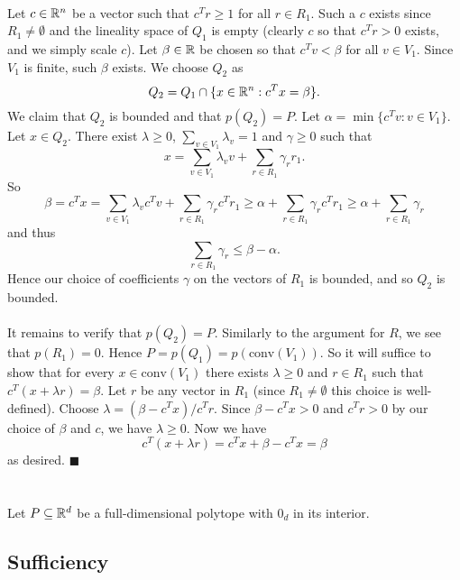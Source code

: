 \documentclass[letterpaper,12pt,oneside,onecolumn]{article}
\newcommand{\conv}[1]{\ensuremath{\text{conv}(#1) }}
\begin{document}
\paragraph{}
Let $c \in \mathbb{R}^n$ be a vector such that $c^Tr \geq 1$ for all $r \in R_1$. Such a $c$ exists since $R_1 \neq \emptyset$ and the lineality space of $Q_1$ is empty (clearly $c$ so that $c^Tr >0$ exists, and we simply scale $c$). Let $\beta \in \mathbb{R}$ be chosen so that $c^Tv < \beta$ for all $v \in V_1$. Since $V_1$ is finite, such $\beta$ exists. We choose $Q_2$ as
$$Q_2 = Q_1 \cap \{x \in \mathbb{R}^n : c^Tx = \beta\}.$$
We claim that $Q_2$ is bounded and that $p(Q_2) = P$. Let $\alpha = \min\{c^Tv : v \in V_1\}$. Let $x \in Q_2$. There exist $\lambda \geq 0$, $\sum_{v \in V_1} \lambda_v = 1$ and $\gamma \geq 0$ such that
$$x = \sum_{v \in V_1} \lambda_v v + \sum_{r \in R_1} \gamma_r r_1.$$
So
$$\beta = c^Tx =  \sum_{v \in V_1} \lambda_v c^Tv + \sum_{r \in R_1} \gamma_r c^Tr_1 \geq \alpha + \sum_{r \in R_1} \gamma_r c^Tr_1\geq \alpha + \sum_{r \in R_1} \gamma_r$$
and thus $$\sum_{r \in R_1} \gamma_r \leq \beta -\alpha.$$
Hence our choice of coefficients $\gamma$ on the vectors of $R_1$ is bounded, and so $Q_2$ is bounded.
\paragraph{}
It remains to verify that $p(Q_2) = P$. Similarly to the argument for $R$, we see that $p(R_1) = 0$. Hence $P = p(Q_1) = p(\conv{V_1}).$ So it will suffice to show that for every $x \in \conv{V_1}$ there exists $\lambda \geq 0$ and $r \in R_1$ such that $c^T(x + \lambda r) = \beta.$ Let $r$ be any vector in $R_1$ (since $R_1 \neq \emptyset$ this choice is well-defined). Choose $\lambda = (\beta - c^Tx)/c^Tr$. Since $\beta-c^Tx >0$ and $c^Tr >0$ by our choice of $\beta$ and $c$, we have $\lambda \geq 0$. Now we have
$$c^T(x + \lambda r) = c^Tx + \beta - c^Tx = \beta$$
as desired. $\blacksquare$

\section{}
\paragraph{}
Let $P \subseteq \mathbb{R}^d$ be a full-dimensional polytope with $0_d$ in its interior.
\subsection*{Sufficiency}
\end{document}
